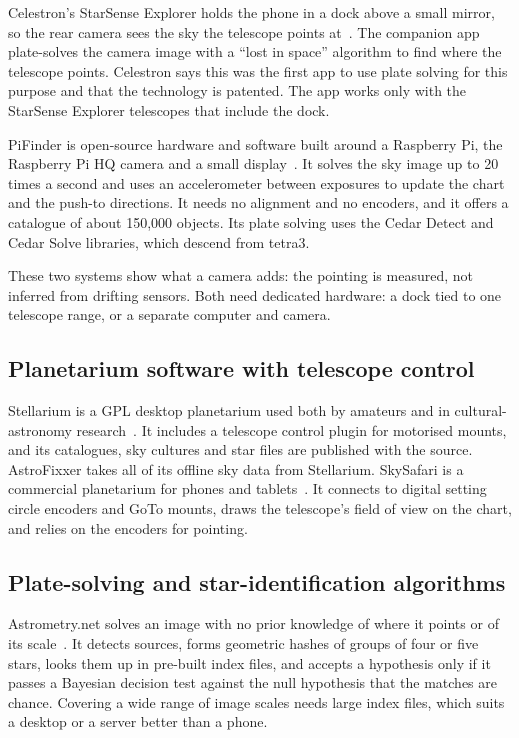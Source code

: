 Celestron's StarSense Explorer holds the phone in a dock above a small mirror, so the rear camera sees the sky the telescope points at~\cite{starsense}. The companion app plate-solves the camera image with a ``lost in space'' algorithm to find where the telescope points. Celestron says this was the first app to use plate solving for this purpose and that the technology is patented. The app works only with the StarSense Explorer telescopes that include the dock.

PiFinder is open-source hardware and software built around a Raspberry Pi, the Raspberry Pi HQ camera and a small display~\cite{pifinder}. It solves the sky image up to 20 times a second and uses an accelerometer between exposures to update the chart and the push-to directions. It needs no alignment and no encoders, and it offers a catalogue of about 150,000 objects. Its plate solving uses the Cedar Detect and Cedar Solve libraries, which descend from tetra3.

These two systems show what a camera adds: the pointing is measured, not inferred from drifting sensors. Both need dedicated hardware: a dock tied to one telescope range, or a separate computer and camera.

\subsection{Planetarium software with telescope control}

Stellarium is a GPL desktop planetarium used both by amateurs and in cultural-astronomy research~\cite{zotti2021}. It includes a telescope control plugin for motorised mounts, and its catalogues, sky cultures and star files are published with the source. AstroFixxer takes all of its offline sky data from Stellarium. SkySafari is a commercial planetarium for phones and tablets~\cite{skysafari}. It connects to digital setting circle encoders and GoTo mounts, draws the telescope's field of view on the chart, and relies on the encoders for pointing.

\subsection{Plate-solving and star-identification algorithms}

Astrometry.net solves an image with no prior knowledge of where it points or of its scale~\cite{lang2010}. It detects sources, forms geometric hashes of groups of four or five stars, looks them up in pre-built index files, and accepts a hypothesis only if it passes a Bayesian decision test against the null hypothesis that the matches are chance. Covering a wide range of image scales needs large index files, which suits a desktop or a server better than a phone.

